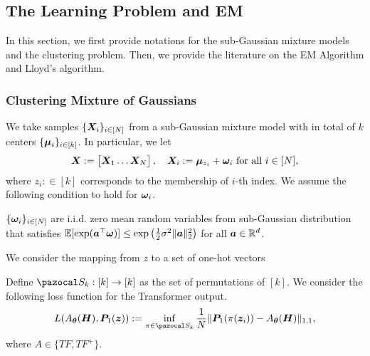 \subsection{The Learning Problem and EM}\label{emintro}
In this section, we first provide notations for the sub-Gaussian mixture models and the clustering problem. Then, we provide the literature on the EM Algorithm and Lloyd's algorithm.
\subsubsection{Clustering Mixture of Gaussians}
 We take samples $\{\boldsymbol{X}_i\}_{i\in[N]}$ from a sub-Gaussian mixture model with in total of $k$ centers $\{\boldsymbol{\mu}_i\}_{i\in[k]}$. In particular, we let
 \begin{align*}
  \boldsymbol{X}:=\begin{bmatrix}
      \boldsymbol{X}_1\ldots\boldsymbol{X}_N
  \end{bmatrix},\quad   \boldsymbol{X}_i := \boldsymbol{\mu}_{z_i}+\boldsymbol{\omega}_i\text{ for all }i\in[N],
 \end{align*}
 where $z_i:\in[k]$ corresponds to the membership of $i$-th index. We assume the following condition to hold for $\boldsymbol{\omega}_i$.
 \begin{assumption}
     $\{\boldsymbol{\omega}_i\}_{i\in[N]}$ are i.i.d. zero mean random variables from sub-Gaussian distribution that satisfies 
     $\mathbb{E}[\exp(\boldsymbol{a}^\top\boldsymbol{\omega})]\leq\exp\left(\frac{1}{2}\sigma^2\Vert\boldsymbol{a}\Vert_2^2\right)$ for all $\boldsymbol{a}\in\mathbb{R}^d$.
 \end{assumption}
 We consider the mapping from $z$ to a set of one-hot vectors

 
Define $\ca S_k:[k]\to[k]$ as the set of permutations of $[k]$. We consider the following loss function for the Transformer output. 
\begin{align*}
    L(A_{\bfa\theta}(\bfa H),\bfa P_1(\bfa z)):=\inf_{\pi\in\ca S_k}\frac{1}{N}\Vert\bfa P_1(\pi(\bfa z_i))-A_{\bfa\theta}(\bfa H)\Vert_{1,1},
\end{align*}
where $A\in\{TF,TF^+\}$. 
